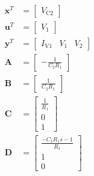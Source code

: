 \begin{align}
\mathbf{x}^T &= \left[\begin{matrix}V_{\mathrm{C2}}\end{matrix}\right]\label{eqn-ss-CV-x} \\
\mathbf{u}^T &= \left[\begin{matrix}V_{1}\end{matrix}\right]\label{eqn-ss-CV-u} \\
\mathbf{y}^T &= \left[\begin{matrix}I_{\mathrm{V1}} & V_{1} & V_{2}\end{matrix}\right]\label{eqn-ss-CV-y} \\
\mathbf{A} &= \left[\begin{matrix}- \frac{1}{C_{2} R_{1}}\end{matrix}\right]\label{eqn-ss-CV-A} \\
\mathbf{B} &= \left[\begin{matrix}\frac{1}{C_{2} R_{1}}\end{matrix}\right]\label{eqn-ss-CV-B} \\
\mathbf{C} &= \left[\begin{matrix}\frac{1}{R_{1}}\\0\\1\end{matrix}\right]\label{eqn-ss-CV-C} \\
\mathbf{D} &= \left[\begin{matrix}\frac{- C_{1} R_{1} s - 1}{R_{1}}\\1\\0\end{matrix}\right]\label{eqn-ss-CV-D}
\end{align}

